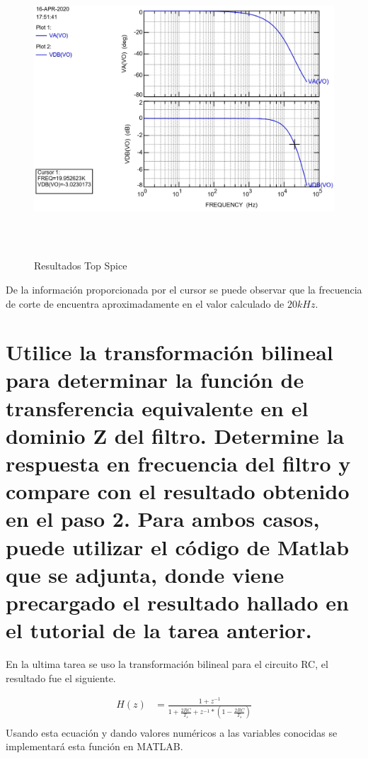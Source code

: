 \documentclass[12pt]{article}
\begin{document}
\begin{figure}[h]
    \centering
    \includegraphics[width=14cm,height=11cm]{imagenes/resut1}
    \caption{Resultados Top Spice }
    \label{fig:results}
\end{figure}

De la información proporcionada por el cursor se puede observar que la frecuencia de corte de encuentra aproximadamente en el valor calculado de $20kHz$.

\section{Utilice la transformación bilineal para determinar la función de transferencia equivalente en el dominio Z del filtro. Determine la respuesta en frecuencia del filtro y compare con el resultado obtenido en el paso 2. Para ambos casos, puede utilizar el código de Matlab que se adjunta, donde viene precargado el resultado hallado en el tutorial de la tarea anterior.}

En la ultima tarea se uso la transformación bilineal para el circuito RC, el resultado fue el siguiente.

\begin{equation}
    \begin{split}
        H(z)&=\frac{1+z^{-1}}{1+\frac{2RC}{T_s}+z^{-1}*(1-\frac{2RC}{T_s})}\\
    \end{split}
    \label{eq:bilineal}
\end{equation}
Usando esta ecuación y dando valores numéricos a las variables conocidas se implementará esta función en MATLAB.
\end{document}
